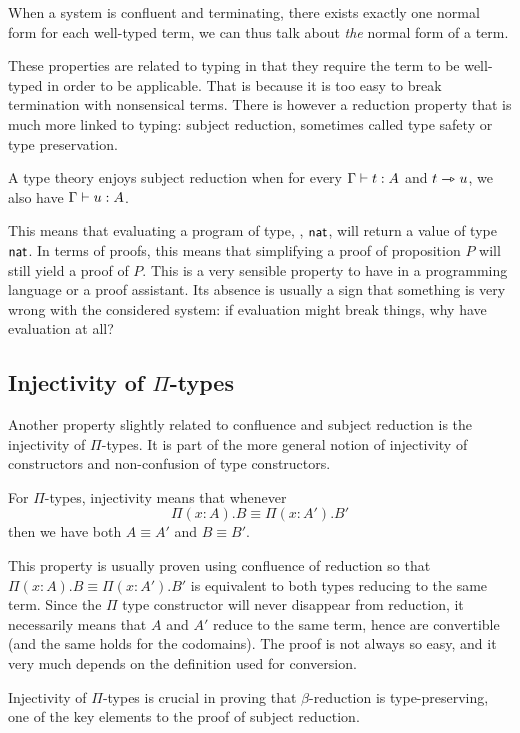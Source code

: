 When a system is confluent and terminating, there exists exactly one normal form
for each well-typed term, we can thus talk about \emph{the} normal form of a
term.

These properties are related to typing in that they require the term to be
well-typed in order to be applicable. That is because it is too easy to break
termination with nonsensical terms.
There is however a reduction property that is much more linked to typing:
subject reduction, sometimes called type safety or type preservation.

\begin{definition}
  A type theory enjoys subject reduction when for every \(\Gamma \vdash t : A\)
  and \(t \rightarrowtriangle u\), we also have \(\Gamma \vdash u : A\).
\end{definition}

This means that evaluating a program of type, \eg, \(\mathsf{nat}\), will return a
value of type \(\mathsf{nat}\). In terms of proofs, this means that simplifying a proof
of proposition \(P\) will still yield a proof of \(P\). This is a very
sensible property to have in a programming language or a proof assistant.
Its absence is usually a sign that something is very wrong with the considered
system: if evaluation might break things, why have evaluation at all?

\subsection{Injectivity of \(\Pi\)-types}

Another property slightly related to confluence and subject reduction is
the injectivity of \(\Pi\)-types. It is part of the more general notion of
injectivity of constructors and non-confusion of type constructors.

For \(\Pi\)-types, injectivity means that whenever
\[
  \Pi (x:A).B \equiv \Pi (x:A').B'
\]
then we have both \(A \equiv A'\) and \(B \equiv B'\).

This property is usually proven using confluence of reduction so that
\(\Pi (x:A).B \equiv \Pi (x:A').B'\) is equivalent to both types
reducing to the same term. Since the \(\Pi\) type constructor will never
disappear from reduction, it necessarily means that \(A\) and \(A'\) reduce to
the same term, hence are convertible (and the same holds for the codomains).
The proof is not always so easy, and it very much depends on the definition
used for conversion.

Injectivity of \(\Pi\)-types is crucial in proving that \(\beta\)-reduction is
type-preserving, one of the key elements to the proof of subject reduction.


